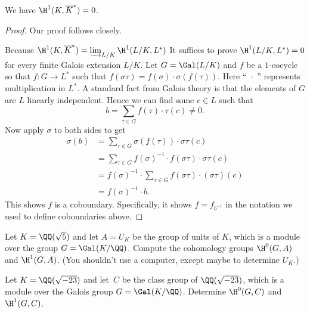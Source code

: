 \begin{theorem}[Hilbert 90]\label{thm:h90}
  We have $\H^1(K,\overline{K}^*) = 0$.
\end{theorem}
\begin{proof}
  Our proof follows \cite[pg.~150]{serre:localfields} closely.
  
  Because $\H^1(K,\overline{K}^*) = \varinjlim_{L/K} \H^1(L/K,L^*)$
  It suffices to prove $\H^1(L/K,L^*) = 0$ for every finite
  Galois extension $L/K$.
  Let $G = \Gal(L/K)$ and $f$ be a $1$-cocycle so that $f:G \to L^*$
  such that $f(\sigma\tau) = f(\sigma)\cdot\sigma(f(\tau))$. Here
  ``~$\cdot$~'' represents multiplication in $L^*$.
  A standard fact from Galois theory is that the elements of
  $G$ are $L$ linearly independent. Hence we can find
  some $c\in L$ such that
  \[
  b = \sum_{\tau\in G} f(\tau)\cdot\tau(c) \neq 0.
  \]
  Now apply $\sigma$ to both sides to get
  \begin{align*}
    \sigma(b)
    &=
    \sum_{\tau\in G} \sigma(f(\tau)) \cdot \sigma\tau(c)
    \\
    &=
    \sum_{\tau\in G} f(\sigma)^{-1} \cdot f(\sigma\tau)
    \cdot \sigma\tau(c)
    \\
    &=
    f(\sigma)^{-1} \cdot \sum_{\tau\in G} f(\sigma\tau)
    \cdot (\sigma\tau)(c)
    \\
    &=
    f(\sigma)^{-1}\cdot b.
  \end{align*}
  This shows $f$ is a coboundary. Specifically, it shows
  $f = f_{b^{-1}}$ in the notation we used to define
  coboundaries above.
\end{proof}

\begin{exercise}
  Let $K=\QQ(\sqrt{5})$ and let $A=U_K$ be the group of units of
  $K$, which is a module over the group $G=\Gal(K/\QQ)$.  Compute the
  cohomology groups $\H^0(G,A)$ and $\H^1(G,A)$.  (You shouldn't use
  a computer, except maybe to determine $U_K$.)
\end{exercise}

\begin{exercise}
  Let $K=\QQ(\sqrt{-23})$ and let~$C$ be the class group of
  $\QQ(\sqrt{-23})$, which is a module over the Galois group $G=\Gal(K/\QQ)$. 
  Determine $\H^0(G,C)$ and $\H^1(G,C)$.
\end{exercise}
